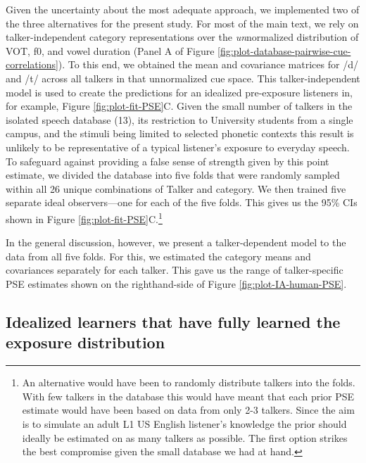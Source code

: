 \documentclass[
  11pt,
  man,mask,floatsintext]{apa6}
\begin{document}
Given the uncertainty about the most adequate approach, we implemented two of the three alternatives for the present study. For most of the main text, we rely on talker-independent category representations over the \emph{un}normalized distribution of VOT, f0, and vowel duration (Panel A of Figure \ref{fig:plot-database-pairwise-cue-correlations}). To this end, we obtained the mean and covariance matrices for /d/ and /t/ across all talkers in that unnormalized cue space. This talker-independent model is used to create the predictions for an idealized pre-exposure listeners in, for example, Figure \ref{fig:plot-fit-PSE}C. Given the small number of talkers in the isolated speech database (13), its restriction to University students from a single campus, and the stimuli being limited to selected phonetic contexts this result is unlikely to be representative of a typical listener's exposure to everyday speech. To safeguard against providing a false sense of strength given by this point estimate, we divided the database into five folds that were randomly sampled within all 26 unique combinations of Talker and category. We then trained five separate ideal observers---one for each of the five folds. This gives us the 95\% CIs shown in Figure \ref{fig:plot-fit-PSE}C.\footnote{An alternative would have been to randomly distribute talkers into the folds. With few talkers in the database this would have meant that each prior PSE estimate would have been based on data from only 2-3 talkers. Since the aim is to simulate an adult L1 US English listener's knowledge the prior should ideally be estimated on as many talkers as possible. The first option strikes the best compromise given the small database we had at hand.}

In the general discussion, however, we present a talker-dependent model to the data from all five folds. For this, we estimated the category means and covariances separately for each talker. This gave us the range of talker-specific PSE estimates shown on the righthand-side of Figure \ref{fig:plot-IA-human-PSE}.

\subsection{Idealized learners that have fully learned the exposure distribution}\label{sec:idealized-learners}
\end{document}
